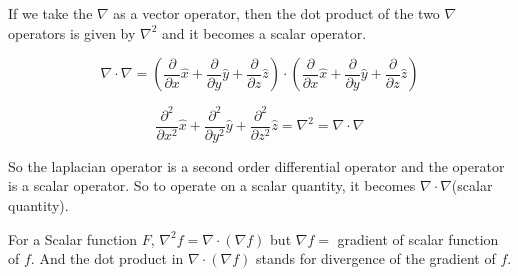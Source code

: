 If we take the $\nabla$ as a vector operator, then the dot product of the two $\nabla$ operators is given by $\nabla^2$ and it becomes a scalar operator.

\begin{dmath}
\nabla \cdot \nabla =  \left(\frac{\partial  }{\partial x}\hat x + \frac{\partial  }{\partial y}\hat y + \frac{\partial  }{\partial z}\hat z \right) \cdot \left( \frac{\partial  }{\partial x}\hat x + \frac{\partial  }{\partial y}\hat y + \frac{\partial  }{\partial z}\hat z\right)
\end{dmath}

\begin{dmath}
\frac{\partial^{2}  }{\partial x^{2}}\hat x + \frac{\partial^{2}  }{\partial y^{2}}\hat y + \frac{\partial^{2}  }{\partial z^{2}}\hat z = \nabla^{2} = \nabla \cdot \nabla
\end{dmath}

So the laplacian operator is a second order differential operator and the operator is a scalar operator. So to operate on a scalar quantity, it becomes $\nabla\cdot\nabla$(scalar quantity).\newline

For a Scalar function $F$, $\nabla^2f = \nabla \cdot (\nabla f)$ but $\nabla f =$ gradient of scalar function of $f$. And the dot product in $\nabla \cdot (\nabla f) $ stands for divergence of the gradient of $f$.

